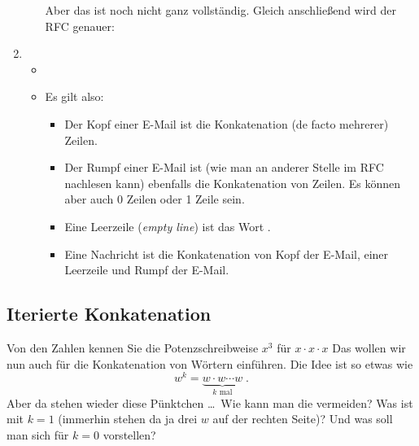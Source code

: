 \begin{enumerate}[1.]
\begin{itemize}
    Aber das ist noch nicht ganz vollständig. Gleich anschließend wird
    der RFC genauer:
  \end{itemize}
\item
  \begin{itemize}
  \item
  \item Es gilt also:
    \begin{itemize}
    \item Der Kopf einer E-Mail ist die Konkatenation (de facto
      mehrerer) Zeilen.
    \item Der Rumpf einer E-Mail ist (wie man an anderer Stelle im RFC
      nachlesen kann) ebenfalls die Konkatenation von Zeilen. Es
      können aber auch 0 Zeilen oder 1 Zeile sein.
    \item Eine Leerzeile (\emph{empty line}) ist das Wort 
      .
    \item Eine Nachricht ist die Konkatenation von Kopf der E-Mail,
      einer Leerzeile und Rumpf der E-Mail.
    \end{itemize}
  \end{itemize}
\end{enumerate}


\Tut\subsection{Iterierte Konkatenation}

Von den Zahlen kennen Sie die Potenzschreibweise $x^3$ für $x\cdot
x\cdot x$ \usw Das wollen wir nun auch für die Konkatenation von
Wörtern einführen. Die Idee ist so etwas wie
%
\[
w^k = \underbrace{w\cdot w \cdots w}_{k \text{ mal}} \;.
\]
%
Aber da stehen wieder diese Pünktchen \dots\ Wie kann man die
vermeiden? Was ist mit $k=1$ (immerhin stehen da ja drei $w$ auf der
rechten Seite)? Und was soll man sich für $k=0$ vorstellen?

